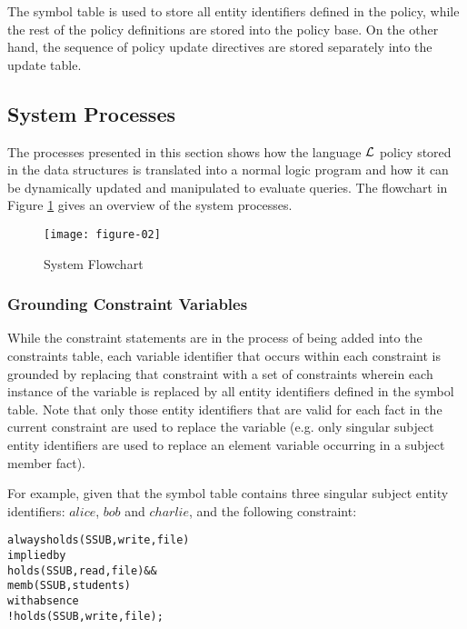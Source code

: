 \documentclass[global,twocolumn,final]{svjour}
\newenvironment{vverbatim}
  {\begin{alltt}}
  {\vspace{-\baselineskip}\end{alltt}}
\begin{document}
        The symbol table is used to store all entity identifiers defined in the
        policy, while the rest of the policy definitions are stored into the
        policy base. On the other hand, the sequence of policy update
        directives are stored separately into the update table.

    \subsection{System Processes}

      The processes presented in this section shows how the language
      ${\cal L}$ policy stored in the data structures is translated into a
      normal logic program and how it can be dynamically updated and
      manipulated to evaluate queries. The flowchart in Figure \ref{fig-2}
      gives an overview of the system processes.

      \begin{figure}[ht]
        \begin{center}
          \texttt{[image: figure-02]}
          \caption{System Flowchart}
          \label{fig-2}
        \end{center}
      \end{figure}

      \subsubsection{Grounding Constraint Variables}

        While the constraint statements are in the process of being added into
        the constraints table, each variable identifier that occurs within each
        constraint is grounded by replacing that constraint with a set of
        constraints wherein each instance of the variable is replaced by all
        entity identifiers defined in the symbol table. Note that only those
        entity identifiers that are valid for each fact in the current
        constraint are used to replace the variable (e.g. only singular
        subject entity identifiers are used to replace an element variable
        occurring in a subject member fact).

        For example, given that the symbol table contains three singular
        subject entity identifiers: $alice$, $bob$ and $charlie$, and the
        following constraint:

        \begin{vverbatim}
  always holds(SSUB, write, file)
    implied by
      holds(SSUB, read, file) &&
      memb(SSUB, students)
    with absence
      !holds(SSUB, write, file);
        \end{vverbatim}
\end{document}

